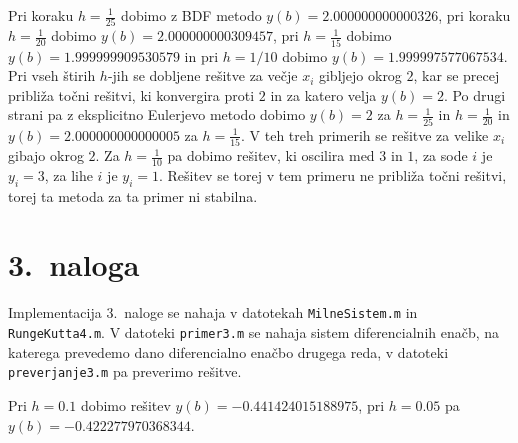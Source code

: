 \documentclass[a4paper,12pt]{article}
\begin{document}
Pri koraku $h=\frac{1}{25}$ dobimo z BDF metodo $y(b)=2.000000000000326$,
pri koraku $h=\frac{1}{20}$ dobimo $y(b)=2.000000000309457$, pri $h=\frac{1}{15}$
dobimo $y(b)=1.999999909530579$ in pri $h=1/10$ dobimo $y(b)=1.999997577067534$. 
Pri vseh štirih $h$-jih se dobljene rešitve za večje $x_i$ gibljejo okrog $2$,
kar se precej približa točni rešitvi, ki konvergira proti $2$ in za katero velja
$y(b)=2$.
Po drugi strani pa z eksplicitno Eulerjevo metodo dobimo $y(b)=2$ za $h=\frac{1}{25}$
in $h=\frac{1}{20}$ in $y(b)=2.000000000000005$ za $h=\frac{1}{15}$. V teh treh
primerih se rešitve za velike $x_i$ gibajo okrog $2$. Za $h=\frac{1}{10}$ pa 
dobimo rešitev, ki oscilira med $3$ in $1$, za sode $i$ je $y_i=3$, za lihe
$i$ je $y_i=1$. Rešitev se torej v tem primeru ne približa točni rešitvi, 
torej ta metoda za ta primer ni stabilna.

\section*{3.\ naloga}

Implementacija 3.\ naloge se nahaja v datotekah \texttt{MilneSistem.m}
in \texttt{RungeKutta4.m}. V datoteki \texttt{primer3.m} se nahaja sistem 
diferencialnih enačb, na katerega prevedemo dano diferencialno enačbo drugega reda,
v datoteki \texttt{preverjanje3.m} pa preverimo rešitve.

Pri $h=0.1$ dobimo rešitev $y(b)=-0.441424015188975$, pri $h=0.05$ pa 
$y(b)=-0.422277970368344$.
\end{document}
